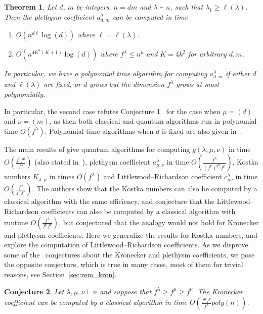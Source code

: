 \documentclass[11pt]{amsart}
\newtheorem{thm}{Theorem}[section]
\newtheorem{conj}[thm]{Conjecture}
\theoremstyle{plain}
\theoremstyle{definition}
\numberwithin{equation}{section}
\newcommand{\la}{\lambda}
\newcommand{\poly}{poly}
\def\la{\lambda}
\begin{document}
\begin{thm}\label{thm:pleth}
Let $d$, $m$ be integers, $n=dm$ and $\la \vdash n$, such that $\la_1 \geq \ell(\la)$. Then the plethysm coefficient $a^\la_{d,m}$ can be computed in time
\begin{enumerate}
\item $O(n^{d\ell}\log(d))$ where $\ell=\ell(\la)$. 
\item $O(n^{4K^3(K+1)}\log(d))$ where  $f^\la \leq n^k$ and $K=4k^2$ for arbitrary $d,m$.
\end{enumerate}
In particular, we have a polynomial time algorithm for computing $a^\la_{d,m}$ if either $d$ and $\ell(\la)$ are fixed, or $d$ grows but the dimension $f^\la$ grows at most polynomially.
\end{thm}

In particular, the second case refutes Conjecture 1~\cite{LH24} for the case when $\mu=(d)$ and $\nu=(m)$, as then both classical and quantum algorithms run in polynomial time $O(f^\la)$. Polynomial time algorithms when $d$ is fixed are also given in~\cite{kahle2016plethysm}. 

The main results of \cite{LH24} give  quantum algorithms for computing $g(\la,\mu,\nu)$ in time $O\left( \frac{f^\nu f^\mu}{f^\la} \right)$ (also stated in~\cite{bravyi2024quantum}), plethysm coefficient $a^\la_{\mu,\nu}$ in time $O\left(\frac{f^\la}{(f^\nu)^{|\mu|} f^\mu}\right)$, Kostka numbers $K_{\la,\mu}$ in times $O(f^\la)$ and Littlewood--Richardson coefficient $c^\la_{\mu\nu}$ in time $O\left(\frac{ f^\la}{f^\mu f^\nu} \right)$. The authors show that the Kostka numbers can also be computed by a classical algorithm with the same efficiency, and conjecture that the Littlewood--Richardson coefficients can also be computed by a classical algorithm with runtime $O\left(\frac{ f^\la}{f^\mu f^\nu} \right)$, but conjectured that the analogy would not hold for Kronecker and plethysm coefficients. Here we generalize the results for Kostka numbers, and explore the computation of Littlewood--Richardson coefficients. As we disprove some of the~\cite{LH24} conjectures about the Kronecker and plethysm coefficients, we pose the opposite conjecture, which is true in many cases, most of them for trivial reasons, see Section~\ref{sec:rem_kron}.

\begin{conj}\label{conj:kron_dim}
Let $\la,\mu,\nu \vdash n$ and suppose that $f^\la \geq f^\mu \geq f^\nu$. The Kronecker coefficient can be computed by a classical algorithm in time $O(\frac{ f^\mu f^\nu}{f^\la} \poly(n) )$. 
\end{conj}
\end{document}
